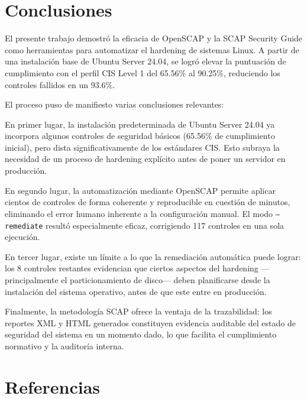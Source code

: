 \documentclass[12pt,letterpaper]{article}
\begin{document}
\section{Conclusiones}

El presente trabajo demostró la eficacia de OpenSCAP y la SCAP Security Guide como herramientas para automatizar el hardening de sistemas Linux. A partir de una instalación base de Ubuntu Server 24.04, se logró elevar la puntuación de cumplimiento con el perfil CIS Level 1 del 65.56\% al 90.25\%, reduciendo los controles fallidos en un 93.6\%.

El proceso puso de manifiesto varias conclusiones relevantes:

En primer lugar, la instalación predeterminada de Ubuntu Server 24.04 ya incorpora algunos controles de seguridad básicos (65.56\% de cumplimiento inicial), pero dista significativamente de los estándares CIS. Esto subraya la necesidad de un proceso de hardening explícito antes de poner un servidor en producción.

En segundo lugar, la automatización mediante OpenSCAP permite aplicar cientos de controles de forma coherente y reproducible en cuestión de minutos, eliminando el error humano inherente a la configuración manual. El modo \texttt{--remediate} resultó especialmente eficaz, corrigiendo 117 controles en una sola ejecución.

En tercer lugar, existe un límite a lo que la remediación automática puede lograr: los 8 controles restantes evidencian que ciertos aspectos del hardening —principalmente el particionamiento de disco— deben planificarse desde la instalación del sistema operativo, antes de que este entre en producción.

Finalmente, la metodología SCAP ofrece la ventaja de la trazabilidad: los reportes XML y HTML generados constituyen evidencia auditable del estado de seguridad del sistema en un momento dado, lo que facilita el cumplimiento normativo y la auditoría interna.

\section{Referencias}
\end{document}

